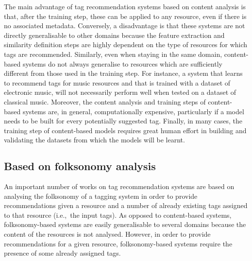 The main advantage of tag recommendation systems based on content analysis is that, after the training step, these can be applied to any resource, even if there is no associated metadata.
Conversely, a disadvantage is that these systems are not directly generalisable to other domains because the feature extraction and similarity definition steps are highly dependent on the type of resources for which tags are recommended. 
Similarly, even when staying in the same domain, content-based systems do not always generalise to resources which are sufficiently different from those used in the training step.
For instance, a system that learns to recommend tags for music resources and that is trained with a dataset of electronic music, will not necessarily perform well when tested on a dataset of classical music.
Moreover, the content analysis and training steps of content-based systems are, in general, computationally expensive, particularly if a model needs to be built for every potentially suggested tag.
Finally, in many cases, the training step of content-based models requires great human effort in building and validating the datasets from which the models will be learnt.


\subsection{Based on folksonomy analysis}
\label{sec:soa:tag_recommendation_folkosnomy_analysis}

An important number of works on tag recommendation systems are based on analysing the folksonomy of a tagging system in order to provide recommendations given a resource and a number of already existing tags assigned to that resource (i.e.,~the input tags).
As opposed to content-based systems, folksonomy-based systems are easily generalisable to several domains because the content of the resources is not analysed. However, in order to provide recommendations for a given resource, folksonomy-based systems require the presence of some already assigned tags.

